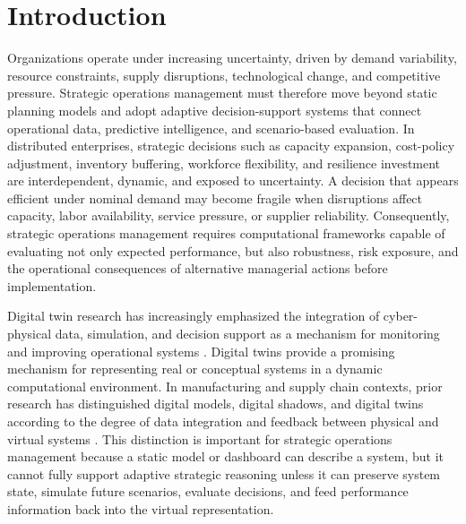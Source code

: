 \documentclass[apajournal,article,submit,pdftex,moreauthors]{Definitions/mdpi}
\begin{document}
\section{Introduction}
Organizations operate under increasing uncertainty, driven by demand variability, resource constraints, supply disruptions, technological change, and competitive pressure. Strategic operations management must therefore move beyond static planning models and adopt adaptive decision-support systems that connect operational data, predictive intelligence, and scenario-based evaluation. In distributed enterprises, strategic decisions such as capacity expansion, cost-policy adjustment, inventory buffering, workforce flexibility, and resilience investment are interdependent, dynamic, and exposed to uncertainty. A decision that appears efficient under nominal demand may become fragile when disruptions affect capacity, labor availability, service pressure, or supplier reliability. Consequently, strategic operations management requires computational frameworks capable of evaluating not only expected performance, but also robustness, risk exposure, and the operational consequences of alternative managerial actions before implementation.

Digital twin research has increasingly emphasized the integration of cyber-physical data, simulation, and decision support as a mechanism for monitoring and improving operational systems \citep{tao2019digital,fuller2020digital}. Digital twins provide a promising mechanism for representing real or conceptual systems in a dynamic computational environment. In manufacturing and supply chain contexts, prior research has distinguished digital models, digital shadows, and digital twins according to the degree of data integration and feedback between physical and virtual systems \citep{kritzinger2018digital}. This distinction is important for strategic operations management because a static model or dashboard can describe a system, but it cannot fully support adaptive strategic reasoning unless it can preserve system state, simulate future scenarios, evaluate decisions, and feed performance information back into the virtual representation.
\end{document}

